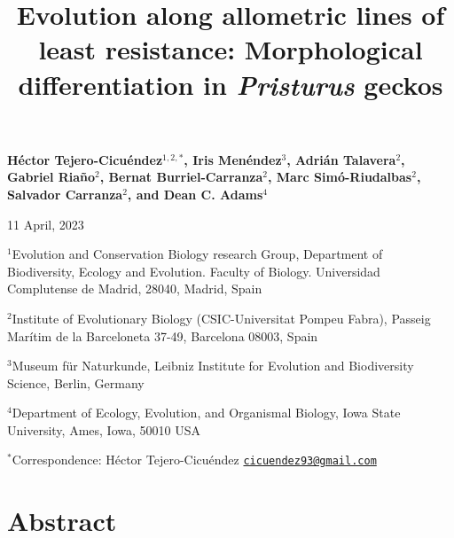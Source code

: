 \documentclass[
  11pt,
]{article}
\title{Evolution along allometric lines of least resistance:
Morphological differentiation in \emph{Pristurus} geckos}
\author{}
\date{\vspace{-2.5em}}
\begin{document}
\maketitle

\begin{center}
\textbf{H{\'{e}}ctor Tejero-Cicu{\'{e}}ndez$^{1,2,*}$,  Iris Men{\'{e}}ndez$^{3}$, Adri{\'{a}}n Talavera$^{2}$, Gabriel Riaño$^{2}$, Bernat Burriel-Carranza$^{2}$, Marc Sim{\'{o}}-Riudalbas$^{2}$, Salvador Carranza$^{2}$, and Dean C. Adams$^{4}$}
\end{center}

\begin{center}11 April, 2023\end{center}

\(^{1}\)Evolution and Conservation Biology research Group, Department of
Biodiversity, Ecology and Evolution. Faculty of Biology. Universidad
Complutense de Madrid, 28040, Madrid, Spain

\(^{2}\)Institute of Evolutionary Biology (CSIC-Universitat Pompeu
Fabra), Passeig Marítim de la Barceloneta 37-49, Barcelona 08003, Spain

\(^{3}\)Museum für Naturkunde, Leibniz Institute for Evolution and
Biodiversity Science, Berlin, Germany

\(^{4}\)Department of Ecology, Evolution, and Organismal Biology, Iowa
State University, Ames, Iowa, 50010 USA

\(^{*}\)Correspondence: Héctor Tejero-Cicuéndez
\href{mailto:cicuendez93@gmail.com}{\nolinkurl{cicuendez93@gmail.com}}

\newpage

\hypertarget{abstract}{%
\section{Abstract}\label{abstract}}
\end{document}

